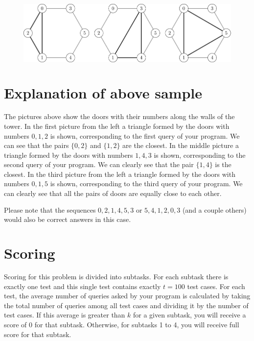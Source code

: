 \medskip

\begin{center}
\begin{figure}[h!]
    \centering
    \includegraphics[width=1\textwidth]{example.pdf}
\end{figure}
\end{center}

\medskip

\section*{Explanation of above sample}
The pictures above show the doors with their numbers along the walls of the tower.
In the first picture from the left
a triangle formed by the doors with numbers $0, 1, 2$ is shown, corresponding to the first query of
your program. We can see that the pairs
$\{0,2\}$ and $\{1,2\}$ are the closest. In the middle picture a triangle formed by the doors with numbers
$1, 4, 3$ is shown, corresponding to the second query of your program.
We can clearly see that the pair $\{1,4\}$ is the closest. In the third picture from the left
a triangle formed by the doors with numbers $0, 1, 5$ is shown, corresponding to the third query
of your program. We can clearly see that all the pairs of doors
are equally close to each other.

Please note that the sequences $0,2,1,4,5,3$ or $5,4,1,2,0,3$ (and a couple others)
would also be correct answers in this case.

\section*{Scoring}

Scoring for this problem is divided into subtasks. For each subtask there is exactly one test
and this single test contains exactly $t=100$ test cases.
For each test, the average number of queries asked by your program is calculated by taking the total number of queries
among all test cases and dividing it by the number of test cases. If this average is greater than $k$ for a given subtask,
you will receive a score of $0$ for that subtask. Otherwise, for subtasks 1 to 4, you will receive full score for that subtask.

